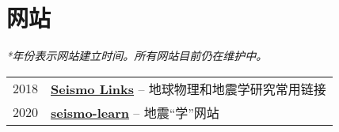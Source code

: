 \section*{网站}

\textit{*年份表示网站建立时间。所有网站目前仍在维护中。}

\begin{tabular}{p{} p{}}
2018 &	\textbf{\href{https://seismo-learn.org/links/}{Seismo Links}} -- 地球物理和地震学研究常用链接 \\
2020 &	\textbf{\href{https://seismo-learn.org/}{seismo-learn}} -- 地震“学”网站 \\
\end{tabular}
